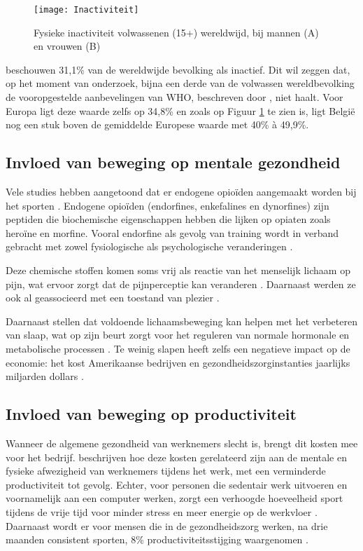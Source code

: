 \begin{figure}[h]
    \caption[Fysieke inactiviteit bij volwassenen wereldwijd]{Fysieke inactiviteit volwassenen (15+) wereldwijd, bij mannen (A) en vrouwen (B) \autocite{Bull2020}}
    \texttt{[image: Inactiviteit]}
    \label{fig:inactivity}
\end{figure}

\textcite{Hallal2012} beschouwen 31,1\% van de wereldwijde bevolking als inactief. Dit wil zeggen dat, op het moment van onderzoek, bijna een derde van de volwassen wereldbevolking de vooropgestelde aanbevelingen van WHO, beschreven door \textcite{Bull2020}, niet haalt. Voor Europa ligt deze waarde zelfs op 34,8\% en zoals op Figuur \ref{fig:inactivity} te zien is, ligt België nog een stuk boven de gemiddelde Europese waarde met 40\% à 49,9\%.

\subsection{Invloed van beweging op mentale gezondheid}
Vele studies hebben aangetoond dat er endogene opioïden aangemaakt worden bij het sporten \autocite{Harber1984}. Endogene opioïden (endorfines, enkefalines en dynorfines) zijn peptiden die biochemische eigenschappen hebben die lijken op opiaten zoals heroïne en morfine. Vooral endorfine als gevolg van training wordt in verband gebracht met zowel fysiologische als psychologische veranderingen \autocite{Dishman2009}.

Deze chemische stoffen komen soms vrij als reactie van het menselijk lichaam op pijn, wat ervoor zorgt dat de pijnperceptie kan veranderen \autocite{Chaudhry2023, Dishman2009}. Daarnaast werden ze ook al geassocieerd met een toestand van plezier \autocite{Chaudhry2023}.

Daarnaast stellen \textcite{Mahindru2023} dat voldoende lichaamsbeweging kan helpen met het verbeteren van slaap, wat op zijn beurt zorgt voor het reguleren van normale hormonale en metabolische processen \autocite{Dolezal2017}. Te weinig slapen heeft zelfs een negatieve impact op de economie: het kost Amerikaanse bedrijven en gezondheidszorginstanties jaarlijks miljarden dollars \autocite{Dolezal2017}.


\subsection{Invloed van beweging op productiviteit}
Wanneer de algemene gezondheid van werknemers slecht is, brengt dit kosten mee voor het bedrijf. \textcite{Sjoegaard2016} beschrijven hoe deze kosten gerelateerd zijn aan de mentale en fysieke afwezigheid van werknemers tijdens het werk, met een verminderde productiviteit tot gevolg. Echter, voor personen die sedentair werk uitvoeren en voornamelijk aan een computer werken, zorgt een verhoogde hoeveelheid sport tijdens de vrije tijd voor minder stress en meer energie op de werkvloer \autocite{Hansen2009}. Daarnaast wordt er voor mensen die in de gezondheidszorg werken, na drie maanden consistent sporten, 8\% productiviteitsstijging waargenomen \autocite{Sjoegaard2016}.

